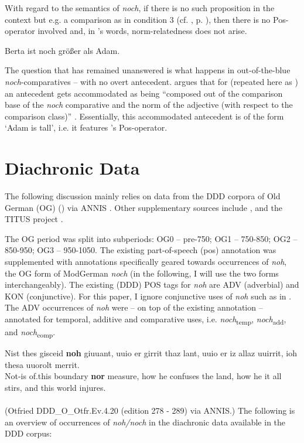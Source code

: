 \documentclass[output=paper
,modfonts
,nonflat]{langsci/langscibook}
\begin{document}
With regard to the semantics of \textit{noch}, if there is no such proposition in the context but e.g. a comparison as in condition 3 (cf. , p. \pageref{tab:4_conds}), then there is no Pos-operator involved \citep[62]{stechow1984} and, in \citeauthor{umbach2009a_comp}'s words, norm-relatedness does not arise. 

\ea Berta ist noch größer als Adam. \label{B_noch_>_Adam_repeat}\z

The question that has remained unanswered is what happens in out-of-the-blue \textit{noch}-comparatives -- with no overt antecedent. \citeauthor{umbach2009a_comp} argues that for  (repeated here as ) an antecedent gets accommodated as being ``composed out of the comparison base of the \textit{noch} comparative and the norm of the adjective (with respect to the comparison class)'' \citep[10]{umbach2009a_comp}. Essentially, this accommodated antecedent is of the form `Adam is tall', i.e. it features \citeauthor{stechow2006}'s \citeyearpar{stechow2006} Pos-operator. 


\section{Diachronic Data}\label{sec_diachronic_data}


The following discussion mainly relies on data from the DDD corpora of Old German (OG) (\citeauthor{ddd_OG}) via ANNIS \citep{annis_og}. Other supplementary sources include \citep{kali}, and the TITUS project \citep{titus}.

The OG period was split into subperiods: OG0 -- pre-750; OG1 -- 750-850; OG2 -- 850-950; OG3 -- 950-1050. The existing part-of-speech (pos) annotation was supplemented with annotations specifically geared towards occurrences of \textit{noh}, the OG form of ModGerman \textit{noch} (in the following, I will use the two forms interchangeably). The existing (DDD) POS tags for \textit{noh} are ADV (adverbial) and KON (conjunctive). For this paper, I ignore conjunctive uses of \textit{noh} such as in . The ADV occurrences of \textit{noh} were -- on top of the existing annotation -- annotated for temporal, additive and comparative uses, i.e. \textit{noch}\textsubscript{temp}, \textit{noch}\textsubscript{add}, and \textit{noch}\textsubscript{comp}.


\ea\gll Nist thes gisceid \textbf{noh} giuuant, uuio er girrit thaz lant, uuio er iz allaz uuirrit, ioh thesa uuorolt merrit.\label{KON_noch}\\
       Not-is of.this boundary \textbf{nor} measure, how he confuses the land, how he it all stirs, and this world injures.\\
 \\ (Otfried DDD\_O\_Otfr.Ev.4.20 (edition 278 - 289) via ANNIS.) %
\z
The following is an overview of occurrences of \textit{noh\slash noch} in the diachronic data available in the DDD corpus:
\end{document}
